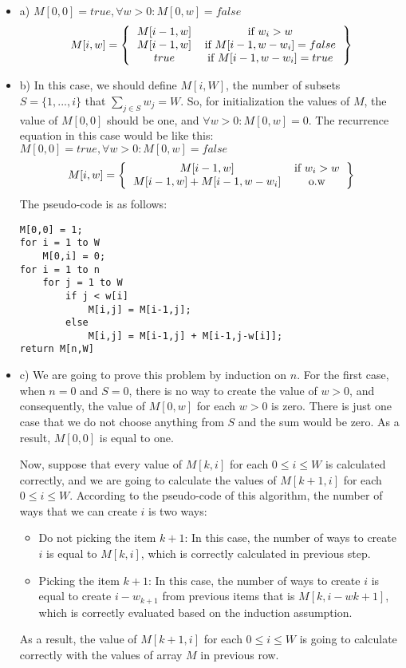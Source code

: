 \documentclass[12pt]{article}
\newenvironment{solution}[2][Solution]{\begin{trivlist}
\item[\hskip \labelsep {\bfseries #1}]}{\end{trivlist}}
\begin{document}
\begin{solution}{}
\begin{itemize}
\item a)
$M[0,0] = true, \forall w>0 : M[0,w] = false$
\[ 
M[i,w]= \left \{
  \begin{tabular}{cc}
  $M[i-1,w]$ & if $w_i > w$ \\
  $M[i-1,w]$ & if $M[i-1,w-w_i] = false$ \\
  $true$ & if $M[i-1,w-w_i] = true$
  \end{tabular}
\right \}
\]

\item b) In this case, we should define $M[i,W]$, the number of subsets $S=\{1,...,i\}$
that $\sum_{j \in S} w_j = W$. So, for initialization the values of $M$, the value of $M[0,0]$
should be one, and $\forall w>0 : M[0,w] = 0$. The recurrence equation in this case would be like 
this:
$M[0,0] = true, \forall w>0 : M[0,w] = false$
\[ 
M[i,w]= \left \{
  \begin{tabular}{cc}
  $M[i-1,w]$ & if $w_i > w$ \\
  $M[i-1,w] + M[i-1,w-w_i]$ & o.w
  \end{tabular}
\right \}
\]
\newpage
The pseudo-code is as follows:
\begin{lstlisting}
M[0,0] = 1;
for i = 1 to W
	M[0,i] = 0;
for i = 1 to n
	for j = 1 to W
		if j < w[i]
			M[i,j] = M[i-1,j];
		else
			M[i,j] = M[i-1,j] + M[i-1,j-w[i]];
return M[n,W]
\end{lstlisting}

\item c) We are going to prove this problem by induction on $n$.
For the first case, when $n=0$ and $S = 0$, there is no way to create the value of $w>0$,
and consequently, the value of $M[0,w]$ for each $w>0$ is zero. There is just one case
that we do not choose anything from $S$ and the sum would be zero. As a result, $M[0,0]$
is equal to one.

Now, suppose that every value of $M[k,i]$ for each $0\leq i \leq W$ is calculated correctly,
and we are going to calculate the values of $M[k+1,i]$ for each $0\leq i \leq W$.
According to the pseudo-code of this algorithm, the number of ways that we can create $i$
is two ways:
\begin{itemize}
\item Do not picking the item $k+1$: In this case, the number of ways to create $i$ 
is equal to $M[k,i]$, which is correctly calculated in previous step.
\item Picking the item $k+1$: In this case, the number of ways to create $i$ is equal to
create $i-w_{k+1}$ from previous items that is $M[k,i-w{k+1}]$, which is correctly evaluated
based on the induction assumption.
\end{itemize}
As a result, the value of $M[k+1,i]$ for each $0\leq i \leq W$ is going to calculate correctly
with the values of array $M$ in previous row.
\end{itemize}
\end{solution}


\pagebreak
\end{document}

